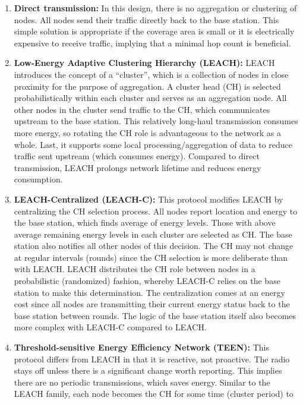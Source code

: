 \begin{enumerate}
  \item \textbf{Direct transmission:} In this design, there is no aggregation
  or clustering of nodes. All nodes send their traffic directly back to the
  base station. This simple solution is appropriate if the coverage area is
  small or it is electrically expensive to receive traffic, implying that a
  minimal hop count is beneficial.
  \item \textbf{Low-Energy Adaptive Clustering Hierarchy (LEACH):} LEACH
  introduces the concept of a ``cluster'', which is a collection of nodes in
  close proximity for the purpose of aggregation. A cluster head (CH) is
  selected probabilistically within each cluster and serves as an aggregation
  node. All other nodes in the cluster send traffic to the CH, which
  communicates upstream to the base station. This relatively long-haul
  transmission consumes more energy, so rotating the CH role is advantageous
  to the network as a whole.  Last, it supports some local
  processing/aggregation of data to reduce traffic sent upstream (which
  consumes energy). Compared to direct transmission, LEACH prolongs network
  lifetime and reduces energy consumption.
  \item \textbf{LEACH-Centralized (LEACH-C):} This protocol modifies LEACH by
  centralizing the CH selection process. All nodes report location and energy
  to the base station, which finds average of energy levels. Those with above
  average remaining energy levels in each cluster are selected as CH. The base
  station also notifies all other nodes of this decision. The CH may not
  change at regular intervals (rounds) since the CH selection is more
  deliberate than with LEACH. LEACH distributes the CH role between nodes in a
  probabilistic (randomized) fashion, whereby LEACH-C relies on the base
  station to make this determination. The centralization comes at an energy
  cost since all nodes are transmitting their current energy status back to
  the base station between rounds. The logic of the base station itself also
  becomes more complex with LEACH-C compared to LEACH.
  \item \textbf{Threshold-sensitive Energy Efficiency Network (TEEN):} This
  protocol differs from LEACH in that it is reactive, not proactive. The radio
  stays off unless there is a significant change worth reporting. This implies
  there are no periodic transmissions, which saves energy. Similar to the
  LEACH family, each node becomes the CH for some time (cluster period) to

\end{enumerate}
